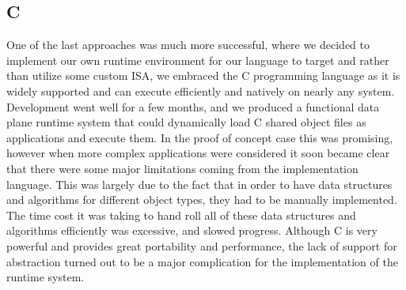 \subsection{C}
One of the last approaches was much more successful, where we decided to 
implement our own runtime environment for our language to target and rather
than utilize some custom ISA, we embraced the C programming language as it
is widely supported and can execute efficiently and natively on nearly any
system. Development went well for a few months, and we produced a functional
data plane runtime system that could dynamically load C shared object files as 
applications and execute them. In the proof of concept case this was 
promising, however when more complex applications were considered it soon 
became clear that there were some major limitations coming from the 
implementation language. This was largely due to the fact that in order to have data structures and algorithms for different object types, they had to
be manually implemented. The time cost it was taking to hand roll all of these
data structures and algorithms efficiently was excessive, and slowed progress.
Although C is very powerful and provides great portability and performance, the
lack of support for abstraction turned out to be a major complication for the
implementation of the runtime system.
